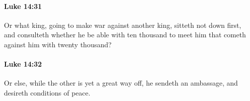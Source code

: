 		\paragraph{Luke 14:31} %
			\label{LUKE-14-31}

			Or what king, going to make war against another king, sitteth not down first, and consulteth whether he be able with ten thousand to meet him that cometh against him with twenty thousand?

			\begin{framed}
			\scriptsize
				\begin{compactdesc}
					\item[SBLG] 
				\end{compactdesc}
			\end{framed}

		\paragraph{Luke 14:32} %
			\label{LUKE-14-32}

			Or else, while the other is yet a great way off, he sendeth an ambassage, and desireth conditions of peace.

